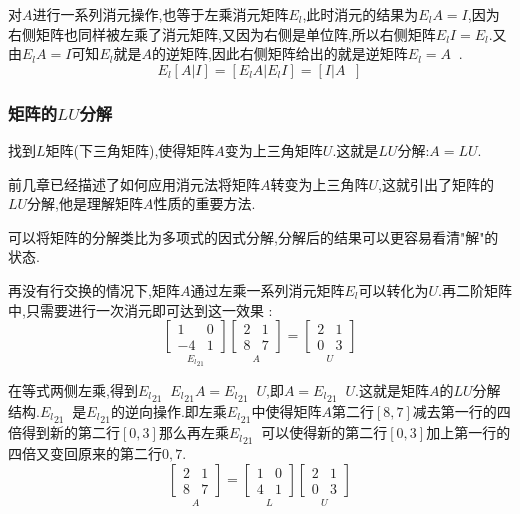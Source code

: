 \documentclass[UTF8,12pt]{ctexbook}
\DeclareMathOperator{\inverse}{^{-1}}
\begin{document}
{{{{{对$A$进行一系列消元操作,也等于左乘消元矩阵$E_l$,此时消元的结果为$E_l A = I$,因为右侧矩阵也同样被左乘了消元矩阵,又因为右侧是单位阵,所以右侧矩阵$E_l I = E_l$.又由$E_l A = I$可知$E_l$就是$A$的逆矩阵,因此右侧矩阵给出的就是逆矩阵$E_l = A\inverse$.
$$
  E_l[A|I] = [E_lA|E_lI] = [I|A\inverse]
$$
}%

\subsubsection{矩阵的$LU$分解}{
找到$L$矩阵(下三角矩阵),使得矩阵$A$变为上三角矩阵$U$.这就是$LU$分解:$A = LU$.

前几章已经描述了如何应用消元法将矩阵$A$转变为上三角阵$U$,这就引出了矩阵的$LU$分解,他是理解矩阵$A$性质的重要方法.

可以将矩阵的分解类比为多项式的因式分解,分解后的结果可以更容易看清"解"的状态.

再没有行交换的情况下,矩阵$A$通过左乘一系列消元矩阵$E_l$可以转化为$U$.再二阶矩阵中,只需要进行一次消元即可达到这一效果 :
$$
  \underset{{E_l}_{21}}{\begin{bmatrix}
      1  & 0 \\
      -4 & 1
    \end{bmatrix}}
  \underset{A}{\begin{bmatrix}
      2 & 1 \\
      8 & 7
    \end{bmatrix}}
  =
  \underset{U}{\begin{bmatrix}
      2 & 1 \\
      0 & 3
    \end{bmatrix}}
$$

在等式两侧左乘,得到${E_l}_{21}\inverse {E_l}_{21} A = {E_l}_{21}\inverse U$,即$A = {E_l}_{21}\inverse U$.这就是矩阵$A$的$LU$分解结构.${E_l}_{21}\inverse$是${E_l}_{21}$的逆向操作.即左乘${E_l}_{21}$中使得矩阵$A$第二行$[8,7]$减去第一行的四倍得到新的第二行$[0,3]$那么再左乘${E_l}_{21}\inverse$可以使得新的第二行$[0,3]$加上第一行的四倍又变回原来的第二行$0,7$.
$$
  \underset{A}{\begin{bmatrix}
      2 & 1 \\
      8 & 7
    \end{bmatrix}}
  =
  \underset{L}{\begin{bmatrix}
      1 & 0 \\
      4 & 1
    \end{bmatrix}}
  \underset{U}{\begin{bmatrix}
      2 & 1 \\
      0 & 3
    \end{bmatrix}}
$$

}}}}}
\end{document}
